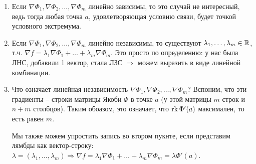 \notice \begin{enumerate}
    \item Если $\nabla \Phi_1, \nabla \Phi_2, \dots, \nabla \Phi_m$ линейно зависимы, то это случай не интересный, ведь тогда любая точка $a$, удовлетворяющая условию связи, будет точкой условного экстремума. 
    \item Если $\nabla \Phi_1, \nabla \Phi_2, \dots, \nabla \Phi_m$ линейно независимы, то существуют $\lambda_1, \dots, \lambda_m \in \mathbb{R}$, т.ч. $\nabla f = \lambda_1 \nabla \Phi_1 + \dots + \lambda_m \nabla \Phi_m$.
    Это просто по определению: у нас была ЛНС, добавили 1 вектор, стала ЛЗС $\Rightarrow$ можем выразить в виде линейной комбинации.
    \item Что означает линейная независимость $\nabla \Phi_1, \nabla \Phi_2, \dots, \nabla \Phi_m$?
    Вспоним, что эти градиенты -- строки матрицы Якоби $\Phi$ в точке $a$ (у этой матрицы $m$ строк и $n+m$ столбцов).
    Таким обоазом, это означает, что $\operatorname{rk} \Phi'(a)$ максимален, то есть равен $m$.
    
    Мы также можем упростить запись во втором пукнте, если представим лямбды как вектор-строку: $\lambda = (\lambda_1, \dots, \lambda_m) \Longrightarrow \nabla f = \lambda_1 \nabla \Phi_1 + \dots + \lambda_m \nabla \Phi_m = \lambda \Phi'(a)$.
\end{enumerate}

